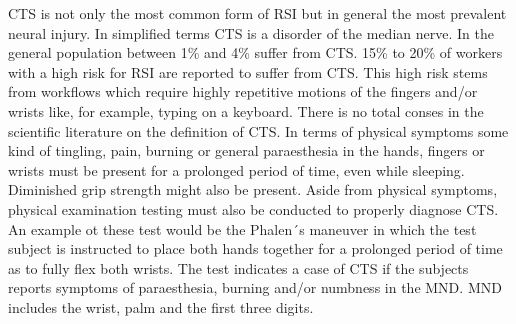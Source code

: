 \gls{CTS} is not only the most common form of \gls{RSI} but in general the most prevalent neural injury\cite{ballestero2017effectiveness}.
In simplified terms \gls{CTS} is a disorder of the median nerve.
In the general population between 1\% and 4\% suffer from \gls{CTS}\cite{bongers2007carpal}.
15\% to 20\% of workers with a high risk for \gls{RSI} are reported to suffer from \gls{CTS}.
This high risk stems from workflows which require highly repetitive motions of the fingers and/or wrists like, for example, typing on a keyboard.
There is no total conses in the scientific literature on the definition of \gls{CTS}\cite{descatha2011comparison}.
In terms of physical symptoms some kind of tingling, pain, burning or general paraesthesia in the hands, fingers or wrists must be present for a prolonged period of time, even while sleeping.
Diminished grip strength might also be present.
Aside from physical symptoms, physical examination testing must also be conducted to properly diagnose \gls{CTS}.
An example ot these test would be the Phalen´s maneuver in which the test subject is instructed to place both hands together for a prolonged period of time as to fully flex both wrists.
The test indicates a case of \gls{CTS} if the subjects reports symptoms of paraesthesia, burning and/or numbness in the \gls{MND}.
\gls{MND} includes the wrist, palm and the first three digits.


